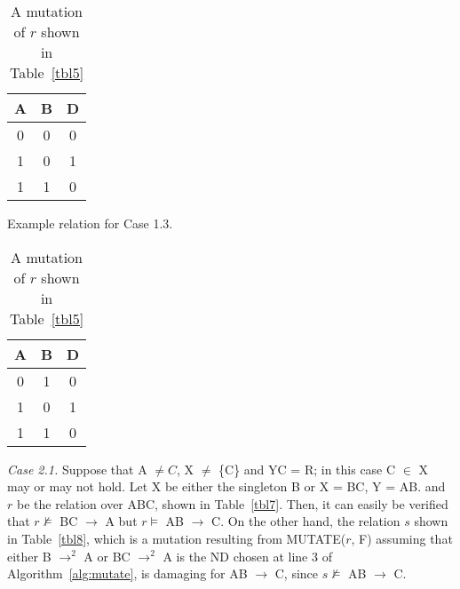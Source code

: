 {\line
\begin{table}[ht]
\begin{minipage}[b]{7cm}
\begin{center}
\begin{tabular}{|c|c|c|} \hline
A & B & D \\ \hline
0 & 0 & 0 \\
1 & 0 & 1 \\ 
1 & 1 & 0 \\ \hline
\end{tabular}
\end{center}
\caption{\label{tbl5} Example relation for Case 1.3.} 
\end{minipage}
\hfill
\begin{minipage}[b]{7cm}
\begin{center}
\begin{tabular}{|c|c|c|} \hline
A & B & D \\ \hline
0 & 1 & 0 \\
1 & 0 & 1 \\ 
1 & 1 & 0 \\ \hline
\end{tabular}
\end{center}
\caption{\label{tbl6} A mutation of $r$ shown in Table~\ref{tbl5}} 
\end{minipage}
\end{table}
}

{\em Case 2.1.}
Suppose that A $\not= C$, X $\not=$ \{C\} and YC = R; 
in this case C $\in$ X may or may not hold.
Let X be either the singleton B or X = BC, Y = AB.
and $r$ be the relation over ABC, shown in Table~\ref{tbl7}.
Then, it can easily be verified that 
$r \not\models$ BC $\to$ A 
but $r \models$ AB $\to$ C.
On the other hand, the relation $s$ shown in Table~\ref{tbl8},
which is a mutation resulting from MUTATE($r$, F) assuming that either
B $\to^2$ A or BC $\to^2$ A is the ND chosen at line 3 of 
Algorithm~\ref{alg:mutate},
is damaging for AB $\to$ C, since $s \not\models$ AB $\to$ C.

